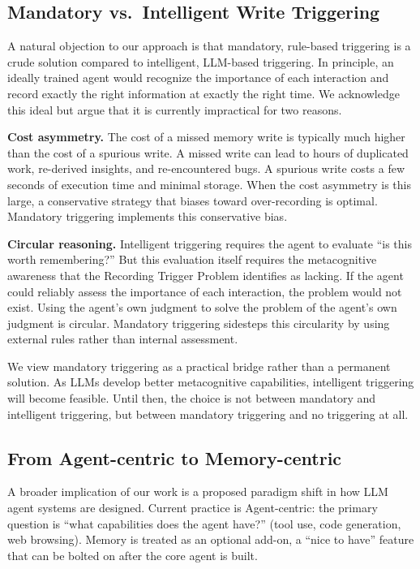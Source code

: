\documentclass[11pt]{article}
\begin{document}
\subsection{Mandatory vs.\ Intelligent Write Triggering}

A natural objection to our approach is that mandatory, rule-based triggering is a crude solution compared to intelligent, LLM-based triggering. In principle, an ideally trained agent would recognize the importance of each interaction and record exactly the right information at exactly the right time. We acknowledge this ideal but argue that it is currently impractical for two reasons.

\textbf{Cost asymmetry.} The cost of a missed memory write is typically much higher than the cost of a spurious write. A missed write can lead to hours of duplicated work, re-derived insights, and re-encountered bugs. A spurious write costs a few seconds of execution time and minimal storage. When the cost asymmetry is this large, a conservative strategy that biases toward over-recording is optimal. Mandatory triggering implements this conservative bias.

\textbf{Circular reasoning.} Intelligent triggering requires the agent to evaluate ``is this worth remembering?'' But this evaluation itself requires the metacognitive awareness that the Recording Trigger Problem identifies as lacking. If the agent could reliably assess the importance of each interaction, the problem would not exist. Using the agent's own judgment to solve the problem of the agent's own judgment is circular. Mandatory triggering sidesteps this circularity by using external rules rather than internal assessment.

We view mandatory triggering as a practical bridge rather than a permanent solution. As LLMs develop better metacognitive capabilities, intelligent triggering will become feasible. Until then, the choice is not between mandatory and intelligent triggering, but between mandatory triggering and no triggering at all.

\subsection{From Agent-centric to Memory-centric}

A broader implication of our work is a proposed paradigm shift in how LLM agent systems are designed. Current practice is Agent-centric: the primary question is ``what capabilities does the agent have?'' (tool use, code generation, web browsing). Memory is treated as an optional add-on, a ``nice to have'' feature that can be bolted on after the core agent is built.
\end{document}
